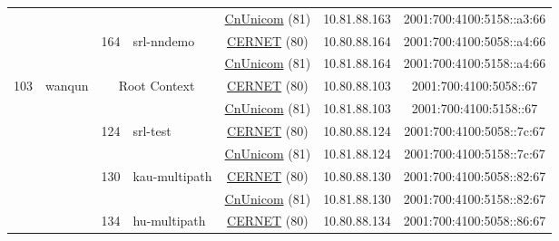 \begin{small}
\begin{center}
\begin{longtable}{|c|c|c|c|c|c|c|c|}
  &  &  &  & \multicolumn{2}{|c|}{\tiny{\href{http://www.chinaunicom.com}{CnUnicom} (81)}} & \tiny{10.81.88.163} & \tiny{2001:700:4100:5158::a3:66} \\* \cline{3-3}\cline{4-4}\cline{5-5}\cline{6-6}\cline{7-7}\cline{8-8}
  &  & \multirow{2}{*}{\tiny{164}} & \multicolumn{1}{|l|}{\multirow{2}{*}{\tiny{srl-nndemo}}} & \multicolumn{2}{|c|}{\tiny{\href{http://www.cernet.edu.cn}{CERNET} (80)}} & \tiny{10.80.88.164} & \tiny{2001:700:4100:5058::a4:66} \\* \cline{5-5}\cline{6-6}\cline{7-7}\cline{8-8}
  &  &  &  & \multicolumn{2}{|c|}{\tiny{\href{http://www.chinaunicom.com}{CnUnicom} (81)}} & \tiny{10.81.88.164} & \tiny{2001:700:4100:5158::a4:66} \\ \hline
 \multirow{18}{*}{\tiny{103}} & \multicolumn{1}{|l|}{\multirow{18}{*}{\tiny{wanqun}}} & \multicolumn{2}{|c|}{\multirow{2}{*}{\tiny{Root Context}}} & \multicolumn{2}{|c|}{\tiny{\href{http://www.cernet.edu.cn}{CERNET} (80)}} & \tiny{10.80.88.103} & \tiny{2001:700:4100:5058::67} \\* \cline{5-5}\cline{6-6}\cline{7-7}\cline{8-8}
  &  & \multicolumn{2}{|c|}{} & \multicolumn{2}{|c|}{\tiny{\href{http://www.chinaunicom.com}{CnUnicom} (81)}} & \tiny{10.81.88.103} & \tiny{2001:700:4100:5158::67} \\* \cline{3-3}\cline{4-4}\cline{5-5}\cline{6-6}\cline{7-7}\cline{8-8}
  &  & \multirow{2}{*}{\tiny{124}} & \multicolumn{1}{|l|}{\multirow{2}{*}{\tiny{srl-test}}} & \multicolumn{2}{|c|}{\tiny{\href{http://www.cernet.edu.cn}{CERNET} (80)}} & \tiny{10.80.88.124} & \tiny{2001:700:4100:5058::7c:67} \\* \cline{5-5}\cline{6-6}\cline{7-7}\cline{8-8}
  &  &  &  & \multicolumn{2}{|c|}{\tiny{\href{http://www.chinaunicom.com}{CnUnicom} (81)}} & \tiny{10.81.88.124} & \tiny{2001:700:4100:5158::7c:67} \\* \cline{3-3}\cline{4-4}\cline{5-5}\cline{6-6}\cline{7-7}\cline{8-8}
  &  & \multirow{2}{*}{\tiny{130}} & \multicolumn{1}{|l|}{\multirow{2}{*}{\tiny{kau-multipath}}} & \multicolumn{2}{|c|}{\tiny{\href{http://www.cernet.edu.cn}{CERNET} (80)}} & \tiny{10.80.88.130} & \tiny{2001:700:4100:5058::82:67} \\* \cline{5-5}\cline{6-6}\cline{7-7}\cline{8-8}
  &  &  &  & \multicolumn{2}{|c|}{\tiny{\href{http://www.chinaunicom.com}{CnUnicom} (81)}} & \tiny{10.81.88.130} & \tiny{2001:700:4100:5158::82:67} \\* \cline{3-3}\cline{4-4}\cline{5-5}\cline{6-6}\cline{7-7}\cline{8-8}
  &  & \multirow{2}{*}{\tiny{134}} & \multicolumn{1}{|l|}{\multirow{2}{*}{\tiny{hu-multipath}}} & \multicolumn{2}{|c|}{\tiny{\href{http://www.cernet.edu.cn}{CERNET} (80)}} & \tiny{10.80.88.134} & \tiny{2001:700:4100:5058::86:67} \\* \cline{5-5}\cline{6-6}\cline{7-7}\cline{8-8}

\end{longtable}
\end{center}
\end{small}
